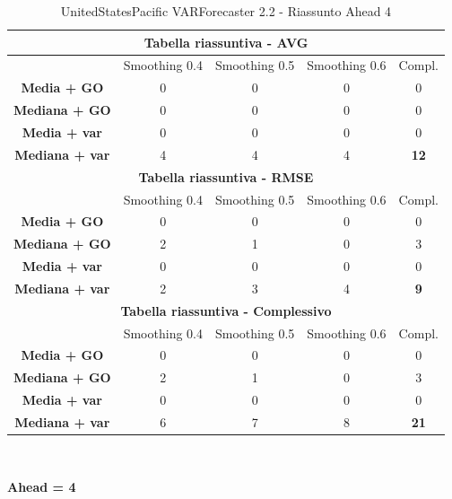 \documentclass[12pt,a4paper,oneside,openright]{book}
\begin{document}
\begin{table}[H]
\centering
\begin{tabular}{|c|c|c|c|c|}
\hline
\multicolumn{5}{|c|}{\textbf{Tabella riassuntiva - AVG}} \\
\hline
& Smoothing 0.4 & Smoothing 0.5 & Smoothing 0.6 & Compl.\\
\hline
\textbf{Media + GO} & 0 & 0 & 0 & 0\\ 
\hline
\textbf{Mediana + GO} & 0 & 0 & 0 & 0\\
\hline
\textbf{Media + var} & 0 & 0 & 0 & 0\\ 
\hline
\textbf{Mediana + var} & 4 & 4 & 4 & \textbf{12}\\ 
\hline
\multicolumn{5}{|c|}{\textbf{Tabella riassuntiva - RMSE}} \\
\hline
& Smoothing 0.4 & Smoothing 0.5 & Smoothing 0.6 & Compl.\\
\hline
\textbf{Media + GO} & 0 & 0 & 0 & 0\\ 
\hline
\textbf{Mediana + GO} & 2 & 1 & 0 & 3\\
\hline
\textbf{Media + var} & 0 & 0 & 0 & 0\\
\hline
\textbf{Mediana + var} & 2 & 3 & 4 & \textbf{9}\\ 
\hline
\multicolumn{5}{|c|}{\textbf{Tabella riassuntiva - Complessivo}} \\
\hline
& Smoothing 0.4 & Smoothing 0.5 & Smoothing 0.6 & Compl.\\
\hline
\textbf{Media + GO} & 0 & 0 & 0 & 0\\
\hline
\textbf{Mediana + GO} & 2 & 1 & 0 & 3\\
\hline
\textbf{Media + var} & 0 & 0 & 0 & 0\\
\hline
\textbf{Mediana + var} & 6 & 7 & 8 & \textbf{21}\\ 
\hline
\end{tabular} \\ 
\caption{UnitedStatesPacific VARForecaster 2.2 - Riassunto Ahead 4}
\end{table}

\newpage

\textbf{Ahead = 4}

\medskip
\end{document}
